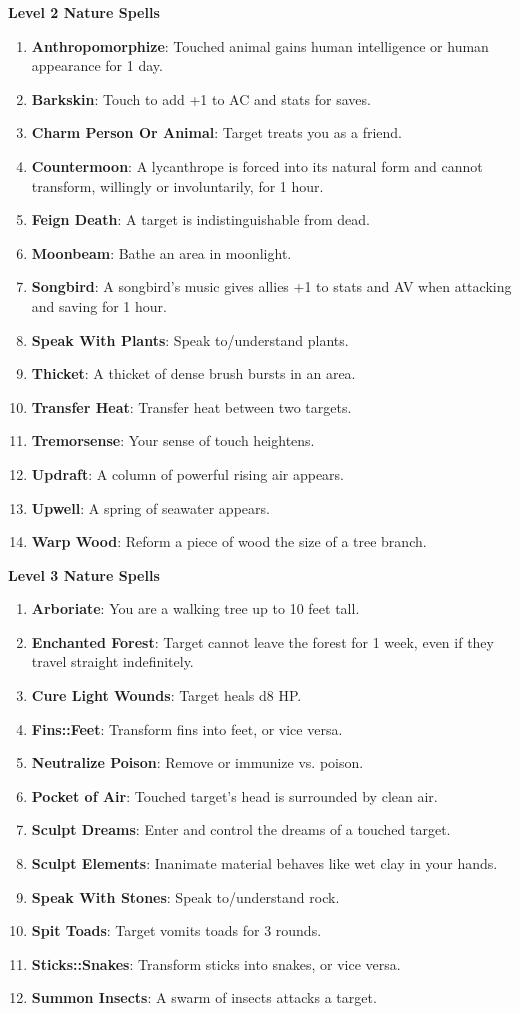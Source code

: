 \documentclass[twoside]{article}
\begin{document}
\textbf{Level 2 Nature Spells}
\begin{enumerate}[nosep]
\item \textbf{Anthropomorphize}: Touched animal gains human intelligence or human appearance for 1 day.
\item \textbf{Barkskin}: Touch to add +1 to AC and stats for saves.
\item \textbf{Charm Person Or Animal}: Target treats you as a friend.
\item \textbf{Countermoon}: A lycanthrope is forced into its natural form and cannot transform, willingly or involuntarily, for 1 hour.
\item \textbf{Feign Death}: A target is indistinguishable from dead.
\item \textbf{Moonbeam}: Bathe an area in moonlight.
\item \textbf{Songbird}: A songbird's music gives allies +1 to stats and AV when attacking and saving for 1 hour.
\item \textbf{Speak With Plants}: Speak to/understand plants.
\item \textbf{Thicket}: A thicket of dense brush bursts in an area.
\item \textbf{Transfer Heat}: Transfer heat between two targets.
\item \textbf{Tremorsense}: Your sense of touch heightens.
\item \textbf{Updraft}: A column of powerful rising air appears.
\item \textbf{Upwell}: A spring of seawater appears.
\item \textbf{Warp Wood}: Reform a piece of wood the size of a tree branch.
\end{enumerate}

\textbf{Level 3 Nature Spells}
\begin{enumerate}[nosep]
\item \textbf{Arboriate}: You are a walking tree up to 10 feet tall.
\item \textbf{Enchanted Forest}: Target cannot leave the forest for 1 week, even if they travel straight indefinitely.
\item \textbf{Cure Light Wounds}: Target heals d8 HP.
\item \textbf{Fins::Feet}: Transform fins into feet, or vice versa.
\item \textbf{Neutralize Poison}: Remove or immunize vs. poison.
\item \textbf{Pocket of Air}: Touched target's head is surrounded by clean air.
\item \textbf{Sculpt Dreams}: Enter and control the dreams of a touched target.
\item \textbf{Sculpt Elements}: Inanimate material behaves like wet clay in your hands.
\item \textbf{Speak With Stones}: Speak to/understand rock.
\item \textbf{Spit Toads}: Target vomits toads for 3 rounds.
\item \textbf{Sticks::Snakes}: Transform sticks into snakes, or vice versa.
\item \textbf{Summon Insects}: A swarm of insects attacks a target.
\end{enumerate}
\end{document}
